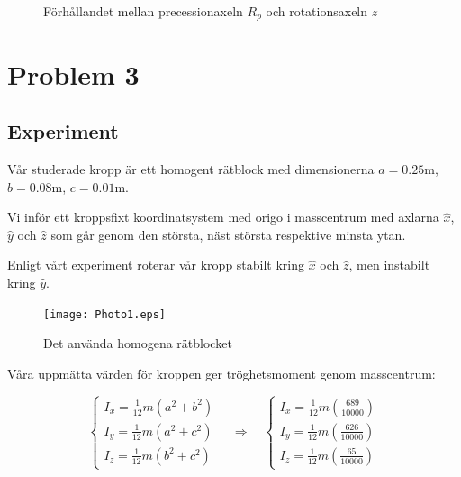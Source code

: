 \documentclass[12pt,a4paper]{article}
\begin{document}
	\begin{figure}
		\begin{center}
			
			\caption{Förhållandet mellan precessionaxeln $R_p$ och rotationsaxeln $z$}
                        \label{jorden}
		\end{center}
	\end{figure}
	
\section{Problem 3}
	
	
	\subsection{Experiment}
		
		Vår studerade kropp är ett homogent rätblock med dimensionerna
		$a = 0.25 \mathrm{m}$, $b = 0.08 \mathrm{m}$, $c = 0.01 \mathrm{m}$.
		
		Vi inför ett kroppsfixt koordinatsystem med origo i masscentrum med axlarna
		$\hat{x}$, $\hat{y}$ och $\hat{z}$ som går genom den största, näst
		största respektive minsta ytan.
		
		Enligt vårt experiment roterar vår kropp stabilt kring $\hat{x}$ och $\hat{z}$, men
		instabilt kring $\hat{y}$.
		
		\begin{figure}
			\begin{center}
				\texttt{[image: Photo1.eps]}
				\caption{Det använda homogena rätblocket}
			\end{center}
		\end{figure}
		
		Våra uppmätta värden för kroppen ger tröghetsmoment genom masscentrum:
		
		\begin{equation*}
			\begin{cases}
				I_x = \frac{1}{12} m (a^2 + b^2) \\
				I_y = \frac{1}{12} m (a^2 + c^2) \\
				I_z = \frac{1}{12} m (b^2 + c^2) 
			\end{cases}
			\hspace{12pt}
			\Rightarrow
			\hspace{12pt}
			\begin{cases}
				I_x = \frac{1}{12} m (\frac{689}{10000}) \\
				I_y = \frac{1}{12} m (\frac{626}{10000}) \\
				I_z = \frac{1}{12} m (\frac{65}{10000})
			\end{cases}
		\end{equation*}
		
\end{document}
